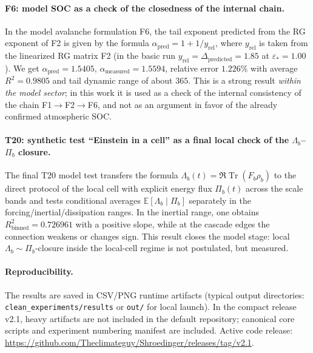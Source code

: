 \documentclass[11pt,a4paper]{article}
\DeclareMathOperator{\Tr}{Tr}
\theoremstyle{definition}
\theoremstyle{plain}
\theoremstyle{remark}
\begin{document}
\paragraph{F6: model SOC as a check of the closedness of the internal chain.}
In the model avalanche formulation F6, the tail exponent predicted from the RG exponent of F2
is given by the formula $\alpha_{\mathrm{pred}}=1+1/y_{\mathrm{rel}}$, where $y_{\mathrm{rel}}$
is taken from the linearized RG matrix F2
(in the basic run $y_{\mathrm{rel}}=\Delta_{\mathrm{predicted}}=1.85$ at $\varepsilon_\ast=1.00$).
We get $\alpha_{\mathrm{pred}}=1.5405$,
$\alpha_{\mathrm{measured}}=1.5594$, relative error $1.226\%$ with average $R^2=0.9805$
and tail dynamic range of about $365$.
This is a strong result \emph{within the model sector}; in this work it is used as a check of the internal consistency of the chain F1$\to$F2$\to$F6, and not as an argument in favor of the already confirmed atmospheric SOC.
\paragraph{T20: synthetic test ``Einstein in a cell'' as a final local check of the $\Lambda_b$--$\Pi_b$ closure.}

The final T20 model test transfers the formula \(\Lambda_b(t)=\Re\Tr(F_b\rho_b)\) to the direct protocol of the local cell
with explicit energy flux \(\Pi_b(t)\) across the scale bands and tests conditional averages
\(\mathbb E[\Lambda_b\mid \Pi_b]\) separately in the forcing/inertial/dissipation ranges.
In the inertial range, one obtains
\(R^2_{\mathrm{binned}}=0.726961\) with a positive slope, while at the cascade edges
the connection weakens or changes sign.
This result closes the model stage: local \(\Lambda_b\sim\Pi_b\)-closure
inside the local-cell regime is not postulated, but measured.

\paragraph{Reproducibility.}
The results are saved in CSV/PNG runtime artifacts (typical output directories:
\texttt{clean\_experiments/results} or \texttt{out/} for local launch).
In the compact release v2.1, heavy artifacts are not included in the default repository;
canonical core scripts and experiment numbering manifest are included.
Active code release:
\url{https://github.com/Theclimateguy/Shroedinger/releases/tag/v2.1}.

\end{document}
